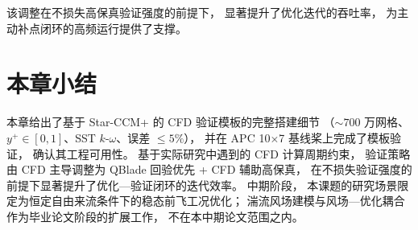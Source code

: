 该调整在不损失高保真验证强度的前提下，
显著提升了优化迭代的吞吐率，
为主动补点闭环的高频运行提供了支撑。

\section{本章小结}

本章给出了基于 Star-CCM+ 的 CFD 验证模板的完整搭建细节
（$\sim 700$ 万网格、$y^+ \in [0, 1]$、SST $k$-$\omega$、误差 $\leq 5\%$），
并在 APC 10$\times$7 基线桨上完成了模板验证，
确认其工程可用性。
基于实际研究中遇到的 CFD 计算周期约束，
验证策略由 CFD 主导调整为 QBlade 回验优先 + CFD 辅助高保真，
在不损失验证强度的前提下显著提升了优化—验证闭环的迭代效率。
中期阶段，
本课题的研究场景限定为恒定自由来流条件下的稳态前飞工况优化；
湍流风场建模与风场—优化耦合作为毕业论文阶段的扩展工作，
不在本中期论文范围之内。
